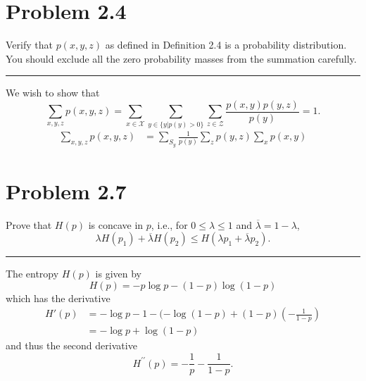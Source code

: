\documentclass{article}
\newcommand{\horline}
           {\begin{center}
              \noindent\rule{8cm}{0.4pt}
            \end{center}}
\begin{document}
\section*{Problem 2.4}
Verify that $p(x,y,z)$ as defined in Definition 2.4 is a probability
distribution. You should exclude all the zero probability masses from the 
summation carefully.
\horline
We wish to show that
$$
\sum_{x,y,z} p(x,y,z) = \sum_{x \in \mathcal{X}} 
                        \sum_{y \in \{y | p(y) > 0\}} 
                        \sum_{z \in \mathcal{Z}} \frac{p(x,y)p(y,z)}{p(y)}
 = 1.
$$
\begin{align*}
\sum_{x,y,z}p(x,y,z) 
  &=\sum_{S_y} \frac{1}{p(y)} \sum_{z} p(y,z) \sum_{x} p(x,y)
\end{align*}

\section*{Problem 2.7}
Prove that $H(p)$ is concave in $p$, i.e., for $0 \leq \lambda \leq 1$ and
$\overline{\lambda} = 1 - \lambda$,
$$
\lambda H(p_1) + \overline{\lambda} H(p_2) 
  \leq H(\lambda p_1 + \overline{\lambda} p_2).
$$
\horline
The entropy $H(p)$ is given by
$$
H(p) = -p \log p - (1 - p) \log (1 - p)
$$
which has the derivative
\begin {align*}
H\prime(p) & = -\log p - 1 - (-\log(1-p) + (1 - p)(-\frac{1}{1-p}) \\
           & = -\log p + \log(1 - p)
\end{align*}
and thus the second derivative
$$
H^{\prime\prime}(p) = -\frac{1}{p} - \frac{1}{1 - p}.
$$
\end{document}
